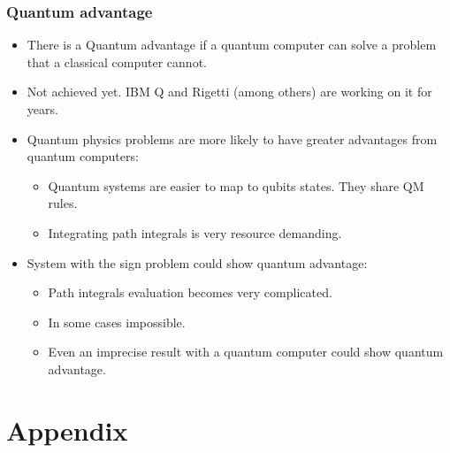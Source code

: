 \documentclass[10pt,t,xcolor=dvipsnames,aspectratio=169]{beamer}
\newlength\leftsidebar
\begin{document}
\begin{frame}
    \frametitle{Quantum advantage}
    \begin{itemize}
        \item
            There is a Quantum advantage if a quantum computer can solve a problem that a classical computer cannot.
        \item
            Not achieved yet. IBM Q and Rigetti (among others) are working on it for years.
        \item
            Quantum physics problems are more likely to have greater advantages from quantum computers:
            \begin{itemize}
                \item Quantum systems are easier to map to qubits states. They share QM rules.
                \item Integrating path integrals is very resource demanding.
            \end{itemize}
        \item
            System with the sign problem could show quantum advantage:
            \begin{itemize}
                \item Path integrals evaluation becomes very complicated.
                \item In some cases impossible.
                \item Even an imprecise result with a quantum computer could show quantum advantage.
            \end{itemize}
    \end{itemize}
\end{frame}

\leftsidebar
\begin{frame}[plain,t]
\titlepage
\end{frame}
\hoffset=0in %

\section{Appendix}
\end{document}
